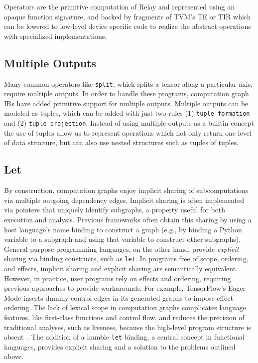 Operators are the primitive computation of Relay and represented using
  an opaque function signature, and backed by fragments of TVM's TE or TIR
  which can be lowered to low-level device specific code to realize
  the abstract operations with specialized implementations.

\subsection{Multiple Outputs}

Many common operators like \verb|split|, which splits
  a tensor along a particular axis, require multiple outputs.
In order to handle these programs,
  computation graph IRs have added primitive support
  for multiple outputs.
Multiple outputs can be modeled as tuples, which can
  be added with just two rules (1) \verb|tuple formation|
  and (2) \verb|tuple projection|.
Instead of using multiple outputs as a builtin concept the use
  of tuples allow us to represent operations which not only return
  one level of data structure, but can also use nested structures
  such as tuples of tuples.

\subsection{Let}

By construction, computation graphs enjoy implicit sharing of subcomputations
  via multiple outgoing dependency edges.
Implicit sharing is often implemented via pointers that uniquely identify subgraphs,
  a property useful for both execution and analysis.
Previous frameworks often obtain this sharing by using a host
  language's name binding to construct a graph (e.g., by binding a Python variable
  to a subgraph and using that variable to construct other subgraphs).
General-purpose programming languages, on the other hand, provide \textit{explicit}
  sharing via binding constructs, such as \verb|let|.
In programs free of scope, ordering, and effects, implicit sharing
  and explicit sharing are semantically equivalent.
However, in practice, user programs rely on effects and ordering,
  requiring previous approaches to provide workarounds.
For example, TensorFlow's Eager Mode inserts dummy control edges
  in its generated graphs to impose effect ordering.
The lack of lexical scope in computation graphs complicates language features,
  like first-class functions and control flow,
  and reduces the precision of traditional analyses,
  such as liveness,
  because the high-level program structure is absent~\citep{funarg, funarg_sol}.
The addition of a humble \verb|let| binding, a central concept in functional languages,
  provides explicit sharing and a solution to the problems outlined above.

